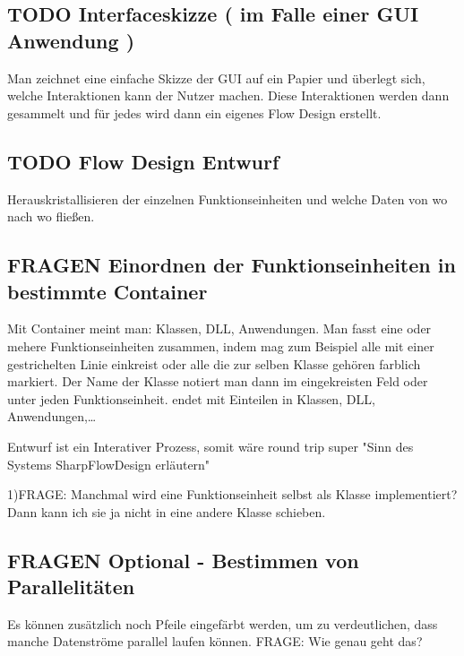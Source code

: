 \documentclass[11pt]{article}
\begin{document}
\subsection{{\bfseries\sffamily TODO} Interfaceskizze ( im Falle einer GUI Anwendung )}
\label{sec:orgheadline76}
Man zeichnet eine einfache Skizze der GUI auf ein Papier und überlegt sich, welche Interaktionen kann der Nutzer machen.
Diese Interaktionen werden dann gesammelt und für jedes wird dann ein eigenes Flow Design erstellt.

\subsection{{\bfseries\sffamily TODO} Flow Design Entwurf}
\label{sec:orgheadline77}
Herauskristallisieren der einzelnen Funktionseinheiten und welche Daten von wo nach wo fließen.

\subsection{{\bfseries\sffamily FRAGEN} Einordnen der Funktionseinheiten in bestimmte Container}
\label{sec:orgheadline78}

Mit Container meint man: Klassen, DLL, Anwendungen.
Man fasst eine oder mehere Funktionseinheiten zusammen, indem mag zum Beispiel alle mit einer gestrichelten Linie einkreist oder alle die zur selben Klasse
gehören farblich markiert. Der Name der Klasse notiert man dann im eingekreisten Feld oder unter jeden Funktionseinheit.
  endet mit Einteilen in Klassen, DLL, Anwendungen,\ldots{}

Entwurf ist ein Interativer Prozess, somit wäre round trip super "Sinn des Systems SharpFlowDesign erläutern"

1)FRAGE: Manchmal wird eine Funktionseinheit selbst als Klasse implementiert? Dann kann ich sie ja nicht in eine andere Klasse schieben.

\subsection{{\bfseries\sffamily FRAGEN} Optional - Bestimmen von Parallelitäten}
\label{sec:orgheadline79}
Es können zusätzlich noch Pfeile eingefärbt werden, um zu verdeutlichen, dass
manche Datenströme parallel laufen können.
FRAGE: Wie genau geht das?
\end{document}
